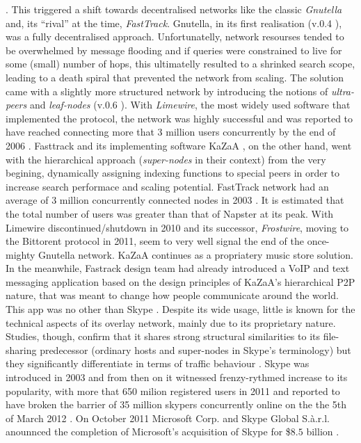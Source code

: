 \documentclass[acmcsur,acmnow]{acmtrans2m}
\begin{document}
\cite{wiki_amnaptrial_2001}. This triggered a shift towards decentralised networks like the classic \emph{Gnutella} and, its ``rival'' at the time, \emph{FastTrack}. Gnutella, in its first realisation (v.0.4 \cite{gnutellav0.4}), was a fully decentralised approach. Unfortunatelly, network resourses tended to be overwhelmed by message flooding and if queries were constrained to live for some (small) number of hops, this ultimatelly resulted to a shrinked search scope, leading to a death spiral that prevented the network from scaling. The solution came with a slightly more structured network by introducing the notions of \emph{ultra-peers} and \emph{leaf-nodes} (v.0.6 \cite{gnutella}). With \emph{Limewire}, the most widely used software that implemented the protocol, the network was highly successful and was reported to have reached connecting more that 3 million users concurrently by the end of 2006 \cite{rsr_gnutellaevol_2006}. Fasttrack and its implementing software KaZaA \cite{kazaa}, on the other hand, went with the hierarchical approach (\emph{super-nodes} in their context) from the very begining, dynamically assigning indexing functions to special peers in order to increase search performace and scaling potential. FastTrack network had an average of 3 million concurrently connected nodes in 2003 \cite{lkr_kazaameasure_2005}. It is estimated that the total number of users was greater than that of Napster at its peak. With Limewire discontinued/shutdown in 2010 and its successor, \emph{Frostwire}, moving to the Bittorent protocol in 2011, seem to very well signal the end of the once-mighty Gnutella network. KaZaA continues as a propriatery music store solution. In the meanwhile, Fastrack design team had already introduced a VoIP and text messaging application based on the design principles of KaZaA's hierarchical P2P nature, that was meant to change how people communicate around the world. This app was no other than Skype \cite{skype}. Despite its wide usage, little is known for the technical aspects of its overlay network, mainly due to its proprietary nature. Studies, though, confirm that it shares strong structural similarities to its file-sharing predecessor (ordinary hosts and super-nodes in Skype's terminology) but they significantly differentiate in terms of traffic behaviour \cite{g_voipskypesec_2005, gdj_skypestudy_2006}. Skype was introduced in 2003 and from then on it witnessed frenzy-rythmed increase to its popularity, with more that 650 milion registered users in 2011  \cite{skypetotalusers} and reported to have broken the barrier of 35 million skypers concurrently online on the the 5th of March 2012 \cite{skypesymusers}. On October 2011 Microsoft Corp. and Skype Global S.à.r.l. anounnced the completion of Microsoft's acquisition of Skype for \$$8.5$ billion \cite{skypemicrosoft}.
\end{document}
